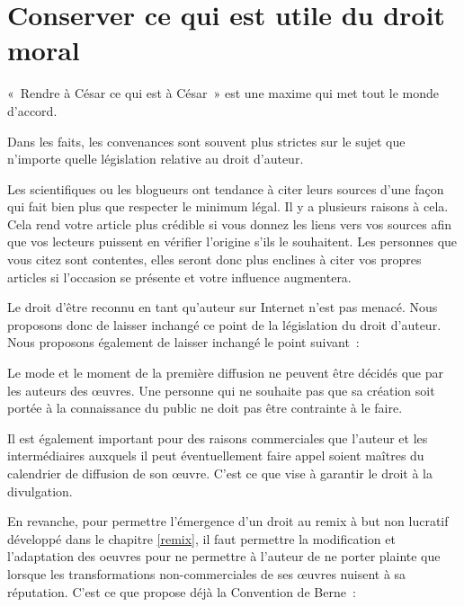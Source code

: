 \chapter{Conserver ce qui est utile du droit moral}\label{pater}

\begin{mesure}
 «~Rendre à César ce qui est à César~» est une maxime qui met tout le monde d’accord.
\end{mesure}

Dans les faits, les convenances sont souvent
plus strictes sur le sujet que n’importe quelle législation relative au droit d’auteur.

Les scientifiques ou les blogueurs ont tendance à citer leurs sources d’une façon qui fait bien plus que respecter le
minimum légal. Il y a plusieurs raisons à cela. Cela rend votre article plus crédible si vous donnez
les liens vers vos sources afin que vos lecteurs puissent en vérifier l’origine s'ils le
souhaitent. Les personnes que vous citez sont contentes, elles seront donc plus enclines à citer
vos propres articles si l’occasion se présente et votre influence augmentera. 

Le droit d’être reconnu en tant qu’auteur sur Internet n’est pas menacé. Nous proposons donc de
laisser inchangé ce point de la législation du droit d’auteur. Nous proposons également de laisser inchangé le point suivant~:

\begin{mesure}
Le mode et le moment de la première diffusion ne peuvent être décidés que par les auteurs des œuvres. Une personne qui ne souhaite pas que sa création soit portée à la connaissance du public ne doit pas être contrainte à le faire.  
\end{mesure}

Il est également important pour des raisons commerciales que l’auteur et les intermédiaires auxquels il peut éventuellement faire appel soient maîtres du calendrier de diffusion de son œuvre. C’est ce que vise à garantir le droit à la divulgation.

En revanche, pour permettre l'émergence d'un droit au remix à but non lucratif développé dans le chapitre \ref{remix}, il faut permettre la modification et l'adaptation des oeuvres  pour ne permettre à l'auteur de ne porter plainte que lorsque les transformations non-commerciales de ses œuvres nuisent à sa réputation. C'est ce que propose déjà la Convention de Berne~:


